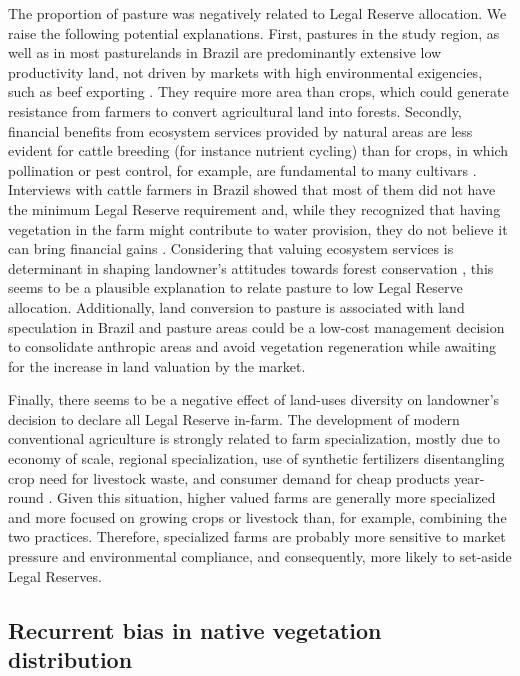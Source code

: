 \documentclass[
	12pt,				%
	oneside,			%
	a4paper,			%
	chapter=TITLE,		%
	section=TITLE,		%
	brazil,			%
	english				%
	]{abntex2}
\begin{document}
The proportion of pasture was negatively related to Legal Reserve allocation. We raise the following potential explanations. First, pastures in the study region, as well as in most pasturelands in Brazil \autocite{strassburg_when_2014} are predominantly extensive low productivity land, not driven by markets with high environmental exigencies, such as beef exporting \autocite{strassburg_when_2014}. They require more area than crops, which could generate resistance from farmers to convert agricultural land into forests. Secondly, financial benefits from ecosystem services provided by natural areas are less evident for cattle breeding (for instance nutrient cycling) than for crops, in which pollination or pest control, for example, are fundamental to many cultivars \autocite{boesing_biodiversity_2018}. Interviews with cattle farmers in Brazil showed that most of them did not have the minimum Legal Reserve requirement and, while they recognized that having vegetation in the farm might contribute to water provision, they do not believe it can bring financial gains \autocite{latawiec_improving_2017}. Considering that valuing ecosystem services is determinant in shaping landowner's attitudes towards forest conservation \autocite{tisovecdufner_intention_2019}, this seems to be a plausible explanation to relate pasture to low Legal Reserve allocation. Additionally, land conversion to pasture is associated with land speculation in Brazil \autocite{strassburg_when_2014} and pasture areas could be a low-cost management decision to consolidate anthropic areas and avoid vegetation regeneration while awaiting for the increase in land valuation by the market.

Finally, there seems to be a negative effect of land-uses diversity on landowner's decision to declare all Legal Reserve in-farm. The development of modern conventional agriculture is strongly related to farm specialization, mostly due to economy of scale, regional specialization, use of synthetic fertilizers disentangling crop need for livestock waste, and consumer demand for cheap products year-round \autocite{bowman_economic_2013}. Given this situation, higher valued farms are generally more specialized and more focused on growing crops or livestock than, for example, combining the two practices. Therefore, specialized farms are probably more sensitive to market pressure and environmental compliance, and consequently, more likely to set-aside Legal Reserves.

\hypertarget{recurrent-bias-in-native-vegetation-distribution}{%
\subsection{Recurrent bias in native vegetation distribution}\label{recurrent-bias-in-native-vegetation-distribution}}
\end{document}

